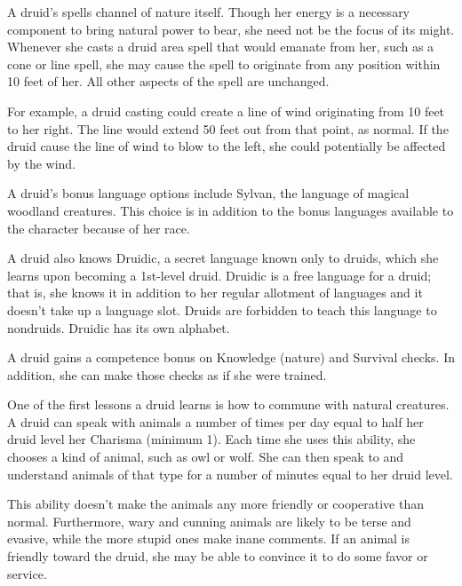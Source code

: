 
 A druid's spells channel of nature itself. Though her energy is a necessary component to bring natural power to bear, she need not be the focus of its might. Whenever she casts a druid area spell that would emanate from her, such as a cone or line spell, she may cause the spell to originate from any position within 10 feet of her. All other aspects of the spell are unchanged.

For example, a druid casting  could create a line of wind originating from 10 feet to her right. The line would extend 50 feet out from that point, as normal. If the druid cause the line of wind to blow to the left, she could potentially be affected by the wind.

 A druid's bonus language options include Sylvan, the language of magical woodland creatures. This choice is in addition to the bonus languages available to the character because of her race.

A druid also knows Druidic, a secret language known only to druids, which she learns upon becoming a 1st-level druid. Druidic is a free language for a druid; that is, she knows it in addition to her regular allotment of languages and it doesn't take up a language slot. Druids are forbidden to teach this language to nondruids. Druidic has its own alphabet.

 A druid gains a  competence bonus on Knowledge (nature) and Survival checks. In addition, she can make those checks as if she were trained.

 One of the first lessons a druid learns is how to commune with natural creatures. A druid can speak with animals a number of times per day equal to half her druid level \add her Charisma (minimum 1). Each time she uses this ability, she chooses a kind of animal, such as owl or wolf. She can then speak to and understand animals of that type for a number of minutes equal to her druid level.

This ability doesn't make the animals any more friendly or cooperative than normal. Furthermore, wary and cunning animals are likely to be terse and evasive, while the more stupid ones make inane comments. If an animal is friendly toward the druid, she may be able to convince it to do some favor or service.

